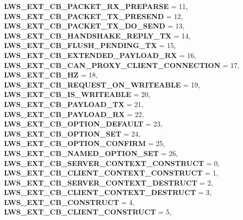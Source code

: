 \begin{DoxyCompactItemize}
{\bfseries L\+W\+S\+\_\+\+E\+X\+T\+\_\+\+C\+B\+\_\+\+P\+A\+C\+K\+E\+T\+\_\+\+R\+X\+\_\+\+P\+R\+E\+P\+A\+R\+SE} = 11, 
{\bfseries L\+W\+S\+\_\+\+E\+X\+T\+\_\+\+C\+B\+\_\+\+P\+A\+C\+K\+E\+T\+\_\+\+T\+X\+\_\+\+P\+R\+E\+S\+E\+ND} = 12, 
\newline
{\bfseries L\+W\+S\+\_\+\+E\+X\+T\+\_\+\+C\+B\+\_\+\+P\+A\+C\+K\+E\+T\+\_\+\+T\+X\+\_\+\+D\+O\+\_\+\+S\+E\+ND} = 13, 
{\bfseries L\+W\+S\+\_\+\+E\+X\+T\+\_\+\+C\+B\+\_\+\+H\+A\+N\+D\+S\+H\+A\+K\+E\+\_\+\+R\+E\+P\+L\+Y\+\_\+\+TX} = 14, 
{\bfseries L\+W\+S\+\_\+\+E\+X\+T\+\_\+\+C\+B\+\_\+\+F\+L\+U\+S\+H\+\_\+\+P\+E\+N\+D\+I\+N\+G\+\_\+\+TX} = 15, 
{\bfseries L\+W\+S\+\_\+\+E\+X\+T\+\_\+\+C\+B\+\_\+\+E\+X\+T\+E\+N\+D\+E\+D\+\_\+\+P\+A\+Y\+L\+O\+A\+D\+\_\+\+RX} = 16, 
\newline
{\bfseries L\+W\+S\+\_\+\+E\+X\+T\+\_\+\+C\+B\+\_\+\+C\+A\+N\+\_\+\+P\+R\+O\+X\+Y\+\_\+\+C\+L\+I\+E\+N\+T\+\_\+\+C\+O\+N\+N\+E\+C\+T\+I\+ON} = 17, 
{\bfseries L\+W\+S\+\_\+\+E\+X\+T\+\_\+\+C\+B\+\_\+HZ} = 18, 
{\bfseries L\+W\+S\+\_\+\+E\+X\+T\+\_\+\+C\+B\+\_\+\+R\+E\+Q\+U\+E\+S\+T\+\_\+\+O\+N\+\_\+\+W\+R\+I\+T\+E\+A\+B\+LE} = 19, 
{\bfseries L\+W\+S\+\_\+\+E\+X\+T\+\_\+\+C\+B\+\_\+\+I\+S\+\_\+\+W\+R\+I\+T\+E\+A\+B\+LE} = 20, 
\newline
{\bfseries L\+W\+S\+\_\+\+E\+X\+T\+\_\+\+C\+B\+\_\+\+P\+A\+Y\+L\+O\+A\+D\+\_\+\+TX} = 21, 
{\bfseries L\+W\+S\+\_\+\+E\+X\+T\+\_\+\+C\+B\+\_\+\+P\+A\+Y\+L\+O\+A\+D\+\_\+\+RX} = 22, 
{\bfseries L\+W\+S\+\_\+\+E\+X\+T\+\_\+\+C\+B\+\_\+\+O\+P\+T\+I\+O\+N\+\_\+\+D\+E\+F\+A\+U\+LT} = 23, 
{\bfseries L\+W\+S\+\_\+\+E\+X\+T\+\_\+\+C\+B\+\_\+\+O\+P\+T\+I\+O\+N\+\_\+\+S\+ET} = 24, 
\newline
{\bfseries L\+W\+S\+\_\+\+E\+X\+T\+\_\+\+C\+B\+\_\+\+O\+P\+T\+I\+O\+N\+\_\+\+C\+O\+N\+F\+I\+RM} = 25, 
{\bfseries L\+W\+S\+\_\+\+E\+X\+T\+\_\+\+C\+B\+\_\+\+N\+A\+M\+E\+D\+\_\+\+O\+P\+T\+I\+O\+N\+\_\+\+S\+ET} = 26, 
{\bfseries L\+W\+S\+\_\+\+E\+X\+T\+\_\+\+C\+B\+\_\+\+S\+E\+R\+V\+E\+R\+\_\+\+C\+O\+N\+T\+E\+X\+T\+\_\+\+C\+O\+N\+S\+T\+R\+U\+CT} = 0, 
{\bfseries L\+W\+S\+\_\+\+E\+X\+T\+\_\+\+C\+B\+\_\+\+C\+L\+I\+E\+N\+T\+\_\+\+C\+O\+N\+T\+E\+X\+T\+\_\+\+C\+O\+N\+S\+T\+R\+U\+CT} = 1, 
\newline
{\bfseries L\+W\+S\+\_\+\+E\+X\+T\+\_\+\+C\+B\+\_\+\+S\+E\+R\+V\+E\+R\+\_\+\+C\+O\+N\+T\+E\+X\+T\+\_\+\+D\+E\+S\+T\+R\+U\+CT} = 2, 
{\bfseries L\+W\+S\+\_\+\+E\+X\+T\+\_\+\+C\+B\+\_\+\+C\+L\+I\+E\+N\+T\+\_\+\+C\+O\+N\+T\+E\+X\+T\+\_\+\+D\+E\+S\+T\+R\+U\+CT} = 3, 
{\bfseries L\+W\+S\+\_\+\+E\+X\+T\+\_\+\+C\+B\+\_\+\+C\+O\+N\+S\+T\+R\+U\+CT} = 4, 
{\bfseries L\+W\+S\+\_\+\+E\+X\+T\+\_\+\+C\+B\+\_\+\+C\+L\+I\+E\+N\+T\+\_\+\+C\+O\+N\+S\+T\+R\+U\+CT} = 5, 

\end{DoxyCompactItemize}
